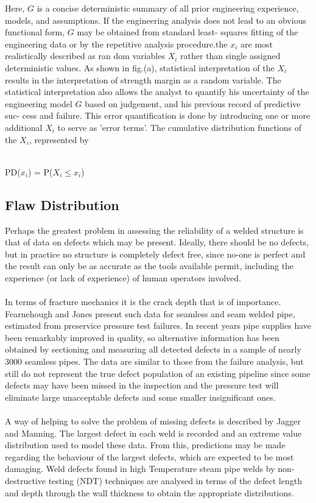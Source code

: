 \documentclass[12pt]{article}
\begin{document}
Here, $G$
is a concise deterministic summary of all prior engineering experience, models, and assumptions. If the
engineering analysis does not lead to an obvious functional 
form, $G$ may be obtained from standard least-
squares fitting of the engineering data or by the repetitive
 analysis procedure.the $x_i$ are most realistically described as ran
dom variables $X_i$ rather than single assigned deterministic values. 
As shown in fig.(a), statistical interpretation 
of the $X_i$ results in the interpretation of
strength margin as a random variable. The statistical
interpretation also allows the analyst to quantify his
uncertainty of the engineering model $G$ based on
judgement, and his previous record of predictive suc-
cess and failure. This error quantification is done by
introducing one or more additional $X_i$ to serve as
'error terms'.
The cumulative distribution functions of the $X_i$,
represented by\\\\
\begin{center}
    PD($x_i$) = P($X_i \le x_i$)
\end{center}

\subsection{Flaw Distribution}
Perhaps the greatest problem in assessing the reliability of a welded structure is that
of data on defects which may be present. Ideally, there should be no defects, but in
practice no structure is completely defect free, since no-one is perfect and the result
can only be as accurate as the tools available permit, including the experience (or
lack of experience) of human operators involved.\\\\
In terms of fracture mechanics it is the crack depth that is of
importance. Fearnehough and Jones present such data for seamless and seam
welded pipe, estimated from preservice pressure test failures. In recent years pipe
supplies have been remarkably improved in quality, so alternative information has
been obtained by sectioning and measuring all detected defects in a sample of nearly
3000 seamless pipes. The data are similar to those from the failure analysis, but still
do not represent the true defect population of an existing pipeline since some defects
may have been missed in the inspection and the pressure test will eliminate large
unacceptable defects and some smaller insignificant ones.\\\\
A way of helping to solve the problem of missing defects is described by Jagger
and Manning. The largest defect in each weld is recorded and an extreme value
distribution used to model these data. From this, predictions may be made
regarding the behaviour of the largest defects, which are expected to be most
damaging. Weld defects found in high Temperature steam pipe welds by non-
destructive testing (NDT) techniques are analysed in terms of the defect length and
depth through the wall thickness to obtain the appropriate distributions.
\end{document}

